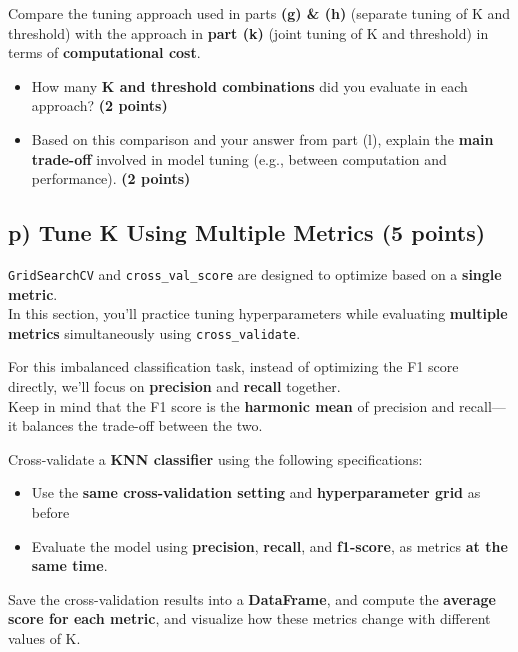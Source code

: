 \documentclass[
  letterpaper,
  DIV=11,
  numbers=noendperiod]{scrreprt}
\providecommand{\tightlist}{%
  \setlength{\itemsep}{0pt}\setlength{\parskip}{0pt}}\usepackage{longtable,booktabs,array}
\begin{document}
Compare the tuning approach used in parts \textbf{(g) \& (h)} (separate
tuning of K and threshold) with the approach in \textbf{part (k)} (joint
tuning of K and threshold) in terms of \textbf{computational cost}.

\begin{itemize}
\tightlist
\item
  How many \textbf{K and threshold combinations} did you evaluate in
  each approach? \textbf{(2 points)}
\item
  Based on this comparison and your answer from part (l), explain the
  \textbf{main trade-off} involved in model tuning (e.g., between
  computation and performance). \textbf{(2 points)}
\end{itemize}

\subsection{\texorpdfstring{p) Tune K Using Multiple Metrics \textbf{(5
points)}}{p) Tune K Using Multiple Metrics (5 points)}}\label{p-tune-k-using-multiple-metrics-5-points}

\texttt{GridSearchCV} and \texttt{cross\_val\_score} are designed to
optimize based on a \textbf{single metric}.\\
In this section, you'll practice tuning hyperparameters while evaluating
\textbf{multiple metrics} simultaneously using \texttt{cross\_validate}.

For this imbalanced classification task, instead of optimizing the F1
score directly, we'll focus on \textbf{precision} and \textbf{recall}
together.\\
Keep in mind that the F1 score is the \textbf{harmonic mean} of
precision and recall---it balances the trade-off between the two.

Cross-validate a \textbf{KNN classifier} using the following
specifications:

\begin{itemize}
\tightlist
\item
  Use the \textbf{same cross-validation setting} and
  \textbf{hyperparameter grid} as before
\item
  Evaluate the model using \textbf{precision}, \textbf{recall}, and
  \textbf{f1-score}, as metrics \textbf{at the same time}.
\end{itemize}

Save the cross-validation results into a \textbf{DataFrame}, and compute
the \textbf{average score for each metric}, and visualize how these
metrics change with different values of K.
\end{document}
